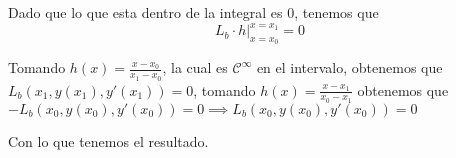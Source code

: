 \documentclass[a4paper,oneside,10.5pt]{USMArt}
\begin{document}
\begin{sol}
  Dado que lo que esta dentro de la integral es $0$, tenemos que
  \begin{equation*}
    L_{b} \cdot h|_{x = x_{0}}^{x = x_{1}} = 0
  \end{equation*}

  Tomando $h(x) = \frac{x - x_{0}}{x_{1} - x_{0}}$, la cual es $\mathcal{C}^{\infty}$ en el intervalo, obtenemos
  que $L_{b}(x_{1}, y(x_{1}), y'(x_{1})) = 0$, tomando
  $h(x) = \frac{x - x_{1}}{x_{0} - x_{1}}$ obtenemos que $-L_{b}(x_{0}, y(x_{0}), y'(x_{0})) = 0 \implies L_{b}(x_{0}, y(x_{0}), y'(x_{0})) = 0$

  Con lo que tenemos el resultado.
\end{sol}
\end{document}
